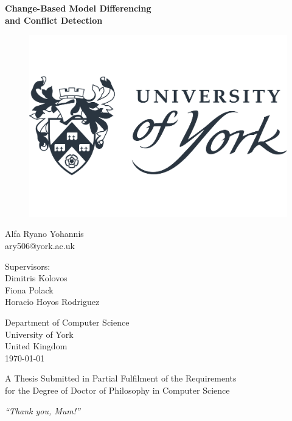 \documentclass[11pt, a4paper]{report} \usepackage[titletoc]{appendix}
\begin{document}
  
  \begin{titlepage}
    \begin{center}
      
      \textbf{\Large Change-Based Model Differencing\\and Conflict Detection}
      
      \vfill
      \begin{figure}[ht]
        \centering
        \includegraphics[width=0.5\linewidth]{uoy}
        \label{fig:uoy}
      \end{figure}
      \vfill
      
      Alfa Ryano Yohannis\\
      ary506@york.ac.uk
      
      \vspace{1cm}
      
      Supervisors:\\
      Dimitris Kolovos\\
      Fiona Polack\\
      Horacio Hoyos Rodriguez
      \vspace{1cm}
      
      Department of Computer Science\\
      University of York\\
      United Kingdom\\
      \vspace{1cm}
      \today
      
      \vfill
      A Thesis Submitted in Partial Fulfilment of the Requirements\\
      for the Degree of Doctor of Philosophy in Computer Science
      
    \end{center}
  \end{titlepage}
  
  \cleardoublepage
  \thispagestyle{empty}  
  \begin{center}
    \vspace*{5cm}
    \LARGE \emph{``Thank you, Mum!''}
  \end{center}
\end{document}
